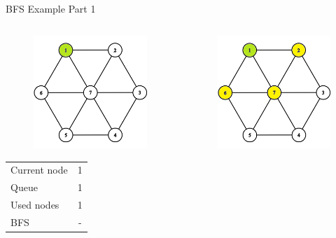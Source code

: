 \documentclass[aspectratio=169]{beamer}%
\begin{document}
\begin{frame}{BFS Example Part 1}
\begin{columns}
\begin{column}{0.32\textwidth}
\begin{figure}[!ht]
                \includegraphics[width=0.9\linewidth]{bfs 2.png}
            \end{figure}
            \begin{table}[ht]
                \centering
                \begin{tabular}{l c}
                    Current node & 1\\
                    Queue & 1 \\ 
                    Used nodes & 1\\
                    BFS & -
                \end{tabular}
            \end{table}
        \end{column}
        \hfill
        \begin{column}{0.32\textwidth}
            \begin{figure}[!ht]
                \centering
                \includegraphics[width=0.9\linewidth]{bfs 3.png}

\end{figure}
\end{column}
\end{columns}
\end{frame}
\end{document}
